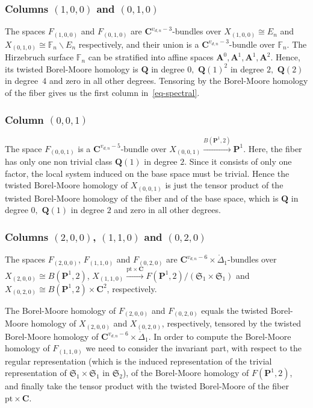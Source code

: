\documentclass[10pt,a4paper,twoside]{amsart}
\theoremstyle{plain}
\theoremstyle{definition}
\theoremstyle{remark}
\begin{document}
\subsubsection*{Columns $(1,0,0)$ and $(0,1,0)$} 
The spaces $F_{(1,0,0)}$ and $F_{(0,1,0)}$ are $\mathbf{C}^{v_{d,n}-3}\mbox{-}$bundles over $X_{(1,0,0)}\cong E_n$ and $X_{(0,1,0)}\cong \mathbb{F}_n\backslash E_n$ respectively, and their union is a $\mathbf{C}^{v_{d,n}-3}\mbox{-}$bundle over $\mathbb{F}_n$. The Hirzebruch surface $\mathbb{F}_n$ can be stratified into affine spaces $\mathbf{A}^0,\mathbf{A}^1, \mathbf{A}^1, \mathbf{A}^2$. Hence, its twisted Borel-Moore homology is $\mathbf{Q}$ in degree $0,$ $\mathbf{Q}(1)^2$ in degree $2,$ $\mathbf{Q}(2)$ in degree~$4$ and zero in all other degrees. Tensoring by the Borel-Moore homology of the fiber gives us the first column in~\eqref{eq-spectral}.

\subsubsection*{Column $(0,0,1)$}
The space $F_{(0,0,1)}$ is a $\mathbf{C}^{v_{d,n}-5}\mbox{-}$bundle over $X_{(0,0,1)}\xrightarrow{B(\mathbf{P}^1,2)}\mathbf{P}^1$. Here, the fiber has only one non trivial class $\mathbf{Q}(1)$ in degree $2$. Since it consists of only one factor, the local system induced on the base space must be trivial. Hence the twisted Borel-Moore homology of $X_{(0,0,1)}$ is just the tensor product of the twisted Borel-Moore homology of the fiber and of the base space, which is $\mathbf{Q}$ in degree $0,$ $\mathbf{Q}(1)$ in degree $2$ and zero in all other degrees. 

\subsubsection*{Columns $(2,0,0)$, $(1,1,0)$ and $(0,2,0)$}
The spaces $F_{(2,0,0)}$,  $F_{(1,1,0)}$ and $F_{(0,2,0)}$ are $\mathbf{C}^{v_{d,n}-6}\times\mathring{\Delta}_1\mbox{-}$bundles over $X_{(2,0,0)}\cong B(\mathbf{P}^1,2)$, $X_{(1,1,0)}\xrightarrow{\mathrm{pt}\times\mathbf{C}} F(\mathbf{P}^1,2)/(\mathfrak{S}_1\times \mathfrak{S}_1)$ and $X_{(0,2,0)}\cong B(\mathbf{P}^1,2)\times\mathbf{C}^2$, respectively. 

The Borel-Moore homology of $F_{(2,0,0)}$ and $F_{(0,2,0)}$ equals the twisted Borel-Moore homology of $X_{(2,0,0)}$ and $X_{(0,2,0)}$, respectively, tensored by the twisted Borel-Moore homology of $\mathbf{C}^{v_{d,n}-6}\times\mathring{\Delta}_1.$
In order to compute the Borel-Moore homology of $F_{(1,1,0)}$  we need to consider the invariant part, with respect to the regular representation (which is the induced representation of the trivial representation of $\mathfrak{S}_1 \times \mathfrak{S}_1$ in $\mathfrak{S}_2$), of the Borel-Moore homology of $F(\mathbf{P}^1,2)$, and finally take the tensor product with the twisted Borel-Moore of the fiber $\mathrm{pt}\times\mathbf{C}.$
\end{document}
